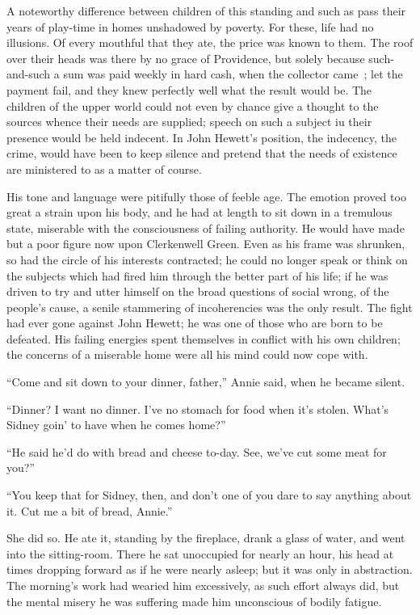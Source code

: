 A noteworthy difference between children of this standing and such as
pass their years of play-time in homes unshadowed by poverty. For these,
life had no illusions. Of every mouthful that they ate, the price was
known to them. The roof over their heads was there by no grace of
Providence, but solely because such-and-such a sum was paid weekly in
hard cash, when the collector came~; let the payment fail, and they knew
perfectly well what the result would be. The children of the upper world
could not even by chance give a thought to the sources whence their
needs are {\protect\hypertarget{262}{}{}} supplied; speech on such a
subject iu their presence would be held indecent. In John Hewett's
position, the indecency, the crime, would have been to keep silence and
pretend that the needs of existence are ministered to as a matter of
course.

His tone and language were pitifully those of feeble age. The emotion
proved too great a strain upon his body, and he had at length to sit
down in a tremulous state, miserable with the consciousness of failing
authority. He would have made but a poor figure now upon Clerkenwell
Green. Even as his frame was shrunken, so had the circle of his
interests contracted; he could no longer speak or think on the subjects
which had fired him through the better part of his life; if he was
driven to try and utter himself on the broad questions of social wrong,
of the people's cause, a senile stammering of incoherencies was the only
result. The fight had ever gone against John Hewett; he was one of those
who are born to be defeated. His failing energies spent themselves in
conflict with his own children; the concerns of a miserable home were
all his mind could now cope with.

{\protect\hypertarget{263}{}{}} ``Come and sit down to your dinner,
father,'' Annie said, when he became silent.

``Dinner? I want no dinner. I've no stomach for food when it's stolen.
What's Sidney goin' to have when he comes home?''

``He said he'd do with bread and cheese to-day. See, we've cut some meat
for you?''

``You keep that for Sidney, then, and don't one of you dare to say
anything about it. Cut me a bit of bread, Annie.''

She did so. He ate it, standing by the fireplace, drank a glass of
water, and went into the sitting-room. There he sat unoccupied for
nearly an hour, his head at times dropping forward as if he were nearly
asleep; but it was only in abstraction. The morning's work had wearied
him excessively, as such effort always did, but the mental misery he was
suffering made him unconscious of bodily fatigue.

